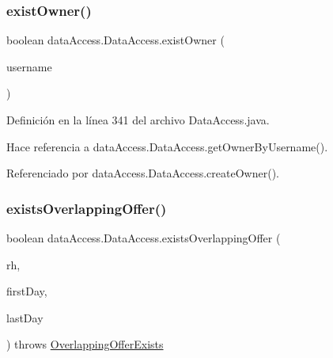 \subsubsection{\texorpdfstring{existOwner()}{existOwner()}}
{\footnotesize\ttfamily boolean data\+Access.\+Data\+Access.\+exist\+Owner (\begin{DoxyParamCaption}\item[{String}]{username }\end{DoxyParamCaption})}



Definición en la línea 341 del archivo Data\+Access.\+java.


\begin{DoxyCode}{0}

\end{DoxyCode}


Hace referencia a data\+Access.\+Data\+Access.\+get\+Owner\+By\+Username().



Referenciado por data\+Access.\+Data\+Access.\+create\+Owner().

\mbox{\label{classdata_access_1_1_data_access_ab6b1332b8bb17a4f65457043247d0b5e}} 
\subsubsection{\texorpdfstring{existsOverlappingOffer()}{existsOverlappingOffer()}}
{\footnotesize\ttfamily boolean data\+Access.\+Data\+Access.\+exists\+Overlapping\+Offer (\begin{DoxyParamCaption}\item[{\mbox{\hyperlink{classdomain_1_1_rural_house}{Rural\+House}}}]{rh,  }\item[{Date}]{first\+Day,  }\item[{Date}]{last\+Day }\end{DoxyParamCaption}) throws \mbox{\hyperlink{classexceptions_1_1_overlapping_offer_exists}{Overlapping\+Offer\+Exists}}}



